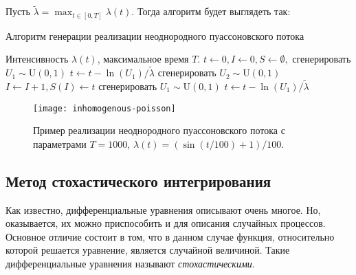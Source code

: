 Пусть \(\tilde{\lambda} = \max_{t \in [0, T]} \lambda(t)\). Тогда алгоритм 
будет выглядеть так:
\begin{algorithm}[H]
	\caption{Алгоритм генерации реализации неоднородного пуассоновского потока}
	\label{algo:inhomogenous-poisson}
	\begin{algorithmic}[1]
		\Require Интенсивность \(\lambda(t)\), максимальное время \(T\).
		\State \(t \gets 0, I \gets 0, S \gets \emptyset, \)
		\State сгенерировать \(U_{1} \sim \mathrm{U}(0, 1)\)
		\State \(t \gets t - \ln(U_{1})/\tilde{\lambda}\)
			\State сгенерировать \(U_{2} \sim \mathrm{U}(0, 1)\)
				\State \(I \gets I + 1, S(I) \gets t\)
			\EndIf
			\State сгенерировать \(U_{1} \sim \mathrm{U}(0, 1)\)
			\State \(t \gets t - \ln(U_{1})/\tilde{\lambda}\)
		\EndWhile
	\end{algorithmic}
\end{algorithm}
\begin{figure}[H]
	\centering\texttt{[image: inhomogenous-poisson]}
	\caption{Пример реализации неоднородного пуассоновского потока с 
	параметрами \(T = 1000\), \(\lambda(t) = (\sin(t/100) + 1)/100\).}
\end{figure}

\subsection{Метод стохастического интегрирования}
Как известно, дифференциальные уравнения описывают очень многое. Но, 
оказывается, их можно приспособить и для описания случайных процессов. Основное 
отличие состоит в том, что в данном случае функция, относительно которой 
решается уравнение, является случайной величиной. Такие дифференциальные 
уравнения называют \emph{стохастическими}.

